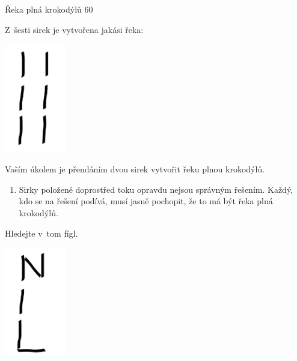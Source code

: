 Řeka plná krokodýlů
60 %

Z~šesti sirek je vytvořena jakási řeka:
\begin{center}
	\includegraphics[width=0.2\textwidth]{../data/Sirky/reka.png}
\end{center}

Vaším úkolem je přendáním dvou sirek vytvořit řeku plnou krokodýlů.

\begin{enumerate}
\item Sirky položené doprostřed toku opravdu nejsou správným řešením. Každý,
	kdo se na řešení podívá, musí jasně pochopit, že to má být řeka plná
	krokodýlů.
\end{enumerate}

Hledejte v~tom fígl.

\begin{center}
	\includegraphics[width=0.2\textwidth]{../data/Sirky/reka_reseni.png}
\end{center}

